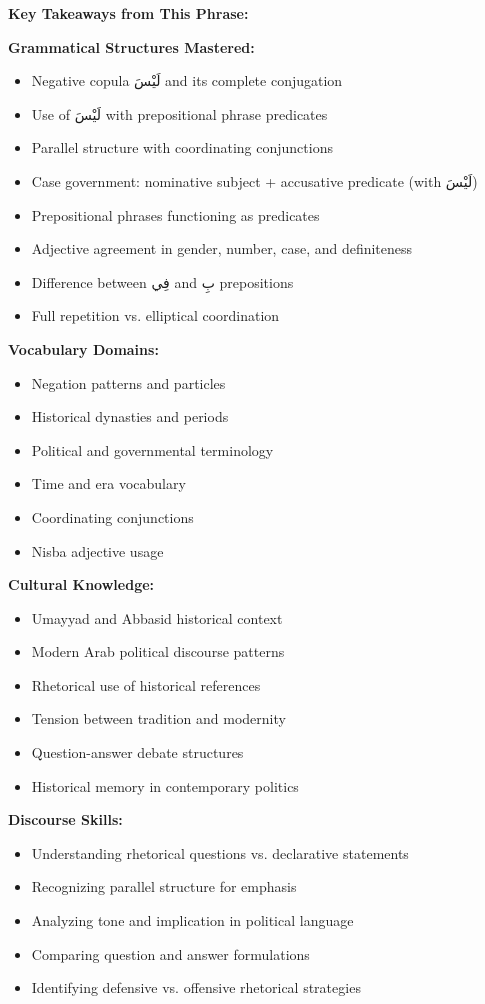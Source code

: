 \documentclass[letterpaper,12pt]{article}
\begin{document}
\begin{tcolorbox}[colback=boxcolor,colframe=accentcolor,breakable]
\textbf{Key Takeaways from This Phrase:}

\textbf{Grammatical Structures Mastered:}
\begin{itemize}
\item Negative copula \textarabic{لَيْسَ} and its complete conjugation
\item Use of \textarabic{لَيْسَ} with prepositional phrase predicates
\item Parallel structure with coordinating conjunctions
\item Case government: nominative subject + accusative predicate (with \textarabic{لَيْسَ})
\item Prepositional phrases functioning as predicates
\item Adjective agreement in gender, number, case, and definiteness
\item Difference between \textarabic{فِي} and \textarabic{بِ} prepositions
\item Full repetition vs. elliptical coordination
\end{itemize}

\textbf{Vocabulary Domains:}
\begin{itemize}
\item Negation patterns and particles
\item Historical dynasties and periods
\item Political and governmental terminology
\item Time and era vocabulary
\item Coordinating conjunctions
\item Nisba adjective usage
\end{itemize}

\textbf{Cultural Knowledge:}
\begin{itemize}
\item Umayyad and Abbasid historical context
\item Modern Arab political discourse patterns
\item Rhetorical use of historical references
\item Tension between tradition and modernity
\item Question-answer debate structures
\item Historical memory in contemporary politics
\end{itemize}

\textbf{Discourse Skills:}
\begin{itemize}
\item Understanding rhetorical questions vs. declarative statements
\item Recognizing parallel structure for emphasis
\item Analyzing tone and implication in political language
\item Comparing question and answer formulations
\item Identifying defensive vs. offensive rhetorical strategies
\end{itemize}


\end{tcolorbox}
\end{document}
